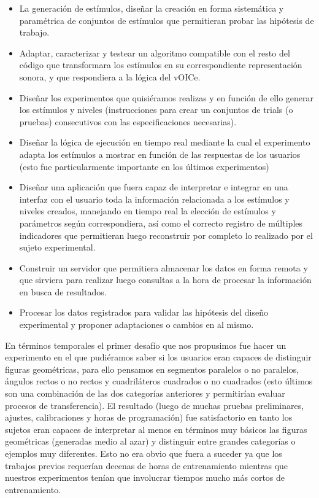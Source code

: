 \documentclass{article}
\begin{document}
    \begin{itemize}
        \item La generación de estímulos, diseñar la creación en forma sistemática y paramétrica de conjuntos de estímulos que permitieran probar las hipótesis de trabajo. 
        \item Adaptar, caracterizar y testear un algoritmo compatible con el resto del código que transformara los estímulos en su correspondiente representación sonora, y que respondiera a la lógica del vOICe. 
        \item Diseñar los experimentos que quisiéramos realizas y en función de ello generar los estímulos y niveles (instrucciones para crear un conjuntos de trials (o pruebas) consecutivos con las especificaciones necesarias).
        \item Diseñar la lógica de ejecución en tiempo real mediante la cual el experimento adapta los estímulos a mostrar en función de las respuestas de los usuarios (esto fue particularmente importante en los últimos experimentos)
        \item Diseñar una aplicación que fuera capaz de interpretar e integrar en una interfaz con el usuario toda la información relacionada a los estímulos y niveles creados, manejando en tiempo real la elección de estímulos y parámetros según correspondiera, así como el correcto registro de múltiples indicadores que permitieran luego reconstruir por completo lo realizado por el sujeto experimental. 
        \item Construir un servidor que permitiera almacenar los datos en forma remota y que sirviera para realizar luego consultas a la hora de procesar la información en busca de resultados.
        \item Procesar los datos registrados para validar las hipótesis del diseño experimental y proponer adaptaciones o cambios en al mismo. 
    \end{itemize}
    
    En términos temporales el primer desafío que nos propusimos fue hacer un experimento en el que pudiéramos saber si los usuarios eran capaces de distinguir figuras geométricas, para ello pensamos en segmentos paralelos o no paralelos, ángulos rectos o no rectos y cuadriláteros cuadrados o no cuadrados (esto últimos son una combinación de las dos categorías anteriores y permitirían evaluar procesos de transferencia). El resultado (luego de muchas pruebas preliminares, ajustes, calibraciones y horas de programación) fue satisfactorio en tanto los sujetos eran capaces de interpretar al menos en términos muy básicos las figuras geométricas (generadas medio al azar) y distinguir entre grandes categorías o ejemplos muy diferentes. Esto no era obvio que fuera a suceder ya que los trabajos previos requerían decenas de horas de entrenamiento mientras que nuestros experimentos tenían que involucrar tiempos mucho más cortos de entrenamiento. 
    
\end{document}

